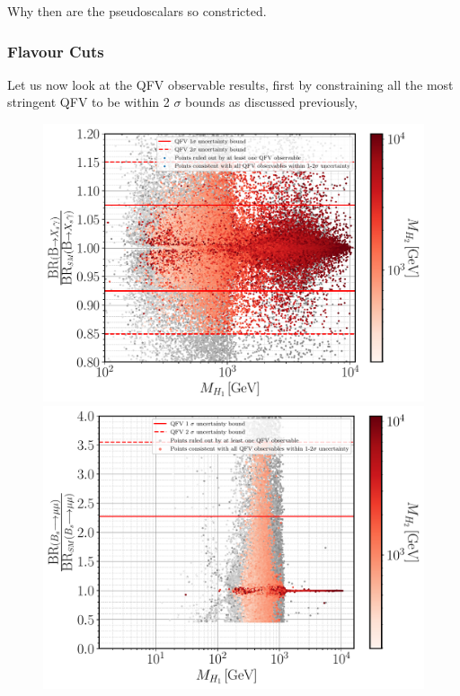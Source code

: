 { \color{red} Why then are the pseudoscalars so constricted. }   

\subsubsection{Flavour Cuts }


Let us now look at the QFV observable results, first by constraining all the most stringent QFV to be within 2 $\sigma$ bounds as discussed previously,
%
%
%
\begin{figure}[H]
	\centering
	\includegraphics[width=.49\textwidth]{Images/3HDM/Reds/Xsgamma_H1_H2.pdf}
	\includegraphics[width=.49\textwidth]{Images/3HDM/Reds/Bsmumu_H1_H2.pdf}
\end{figure}

